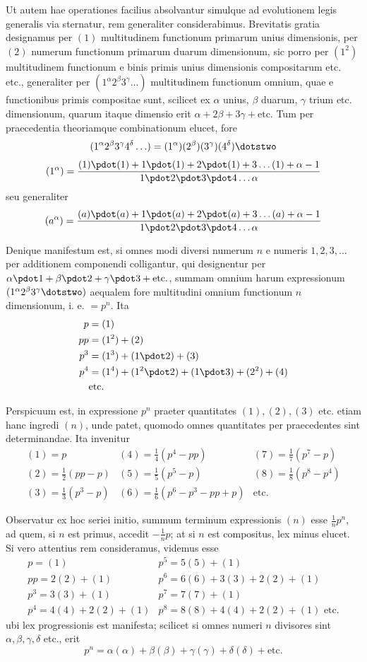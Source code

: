 Ut autem hae operationes facilius absolvantur simulque ad evolutionem legis generalis via sternatur, rem generaliter considerabimus. Brevitatis gratia designamus per $(1)$ multitudinem functionum primarum unius dimensionis, per $(2)$ numerum functionum primarum duarum dimensionum, sic porro per $(1^2)$ multitudinem functionum e binis primis unius dimensionis compositarum etc. etc., generaliter per $(1^\alpha2^\beta3^\gamma\ldots)$ multitudinem functionum omnium, quae e functionibus primis compositae sunt, scilicet ex $\alpha$ unius, $\beta$ duarum, $\gamma$ trium etc. dimensionum, quarum itaque dimensio erit $\alpha+2\beta+3\gamma+\text{etc.}$ Tum per praecedentia theoriamque combinationum elucet, fore
\[
(1^\alpha2^\beta3^\gamma4^\delta\ldots)=(1^\alpha)(2^\beta)(3^\gamma)(4^\delta)\dotstwo
\]
\[
(1^\alpha)=\frac{(1)\pdot(1)+1\pdot(1)+2\pdot(1)+3\ldots(1)+\alpha-1}{1\pdot2\pdot3\pdot4\ldots\alpha}
\]
seu generaliter
\[
(a^\alpha)=\frac{(a)\pdot(a)+1\pdot(a)+2\pdot(a)+3\ldots(a)+\alpha-1}{1\pdot2\pdot3\pdot4\ldots\alpha}
\]

Denique manifestum est, si omnes modi diversi numerum $n$ e numeris $1,2,3,\ldots$ per additionem componendi colligantur, qui designentur per $\alpha\pdot1+\beta\pdot2+\gamma\pdot3+\text{etc.}$, summam omnium harum expressionum $(1^\alpha2^\beta3^\gamma\dotstwo)$ aequalem fore multitudini omnium functionum $n$ dimensionum, i. e. $=p^n$. Ita
\[
\begin{aligned}
p&=(1)\\
pp&=(1^2)+(2)\\
p^3&=(1^3)+(1\pdot2)+(3)\\
p^4&=(1^4)+(1^2\pdot2)+(1\pdot3)+(2^2)+(4)\\
&\text{etc.}
\end{aligned}
\]

Perspicuum est, in expressione $p^n$ praeter quantitates $(1),(2),(3)$ etc. etiam hanc
ingredi $(n)$, unde patet, quomodo omnes quantitates per praecedentes sint determinandae. Ita invenitur
\[
\begin{array}{lll}
(1)=p&(4)=\frac14(p^4-pp)&(7)=\frac17(p^7-p)\\
(2)=\frac12(pp-p)&(5)=\frac15(p^5-p)&(8)=\frac18(p^8-p^4)\\
(3)=\frac13(p^3-p)&(6)=\frac16(p^6-p^3-pp+p)&\text{etc.}
\end{array}
\]

Observatur ex hoc seriei initio, summum terminum expressionis $(n)$ esse $\frac1n p^n$, ad quem, si $n$ est primus, accedit $-\frac1n p$; at si $n$ est compositus, lex minus elucet. Si vero attentius rem consideramus, videmus esse
\[
\begin{array}{ll}
p=(1)&p^5=5(5)+(1)\\
pp=2(2)+(1)&p^6=6(6)+3(3)+2(2)+(1)\\
p^3=3(3)+(1)&p^7=7(7)+(1)\\
p^4=4(4)+2(2)+(1)&p^8=8(8)+4(4)+2(2)+(1)\text{ etc.}
\end{array}
\]
ubi lex progressionis est manifesta; scilicet si omnes numeri $n$ divisores sint $\alpha,\beta,\gamma,\delta$ etc., erit
\[
p^n=\alpha(\alpha)+\beta(\beta)+\gamma(\gamma)+\delta(\delta)+\text{etc.}
\]

